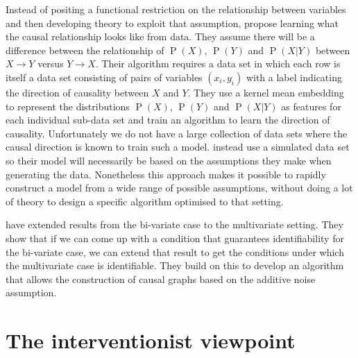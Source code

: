 \documentclass[11pt,a4paper,oneside]{book}
\renewcommand{\P}[1]{\operatorname{P}\left(#1\right)}
\theoremstyle{plain}
\theoremstyle{definition}
\begin{document}
Instead of positing a functional restriction on the relationship between variables and then developing theory to exploit that assumption, \citep{LopezPaz2014} propose learning what the causal relationship looks like from data. They assume there will be a difference between the relationship of $\P{X}$, $\P{Y}$ and $\P{X|Y}$ between $X \rightarrow Y$ versus $Y \rightarrow X$. Their algorithm requires a data set in which each row is itself a data set consisting of pairs of variables $(x_i,y_i)$ with a label indicating the direction of causality between $X$ and $Y$. They use a kernel mean embedding to represent the distributions $\P{X}$, $\P{Y}$ and $\P{X|Y}$ as features for each individual sub-data set and train an algorithm to learn the direction of causality. Unfortunately we do not have a large collection of data sets where the causal direction is known to train such a model. \citet{LopezPaz2014} instead use a simulated data set so their model will necessarily be based on the assumptions they make when generating the data. Nonetheless this approach makes it possible to rapidly construct a model from a wide range of possible assumptions, without doing a lot of theory to design a specific algorithm optimised to that setting. 

\citep{Peters2014} have extended results from the bi-variate case to the multivariate setting. They show that if we can come up with a condition that guarantees identifiability for the bi-variate case, we can extend that result to get the conditions under which the multivariate case is identifiable. They build on this to develop an algorithm that allows the construction of causal graphs based on the additive noise assumption. 

\chapter{The interventionist viewpoint}
\end{document}
